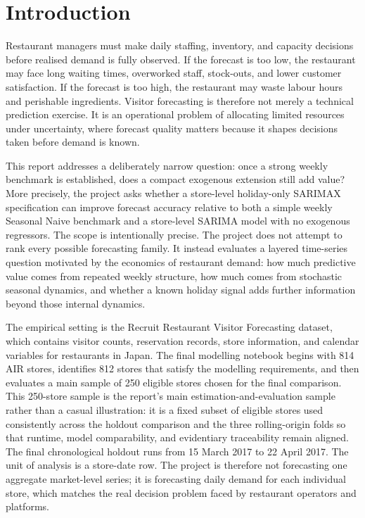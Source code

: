 \documentclass[11pt,oneside]{scrartcl}
\begin{document}
\section{Introduction}
Restaurant managers must make daily staffing, inventory, and capacity decisions before realised demand is fully observed. If the forecast is too low, the restaurant may face long waiting times, overworked staff, stock-outs, and lower customer satisfaction. If the forecast is too high, the restaurant may waste labour hours and perishable ingredients. Visitor forecasting is therefore not merely a technical prediction exercise. It is an operational problem of allocating limited resources under uncertainty, where forecast quality matters because it shapes decisions taken before demand is known.

This report addresses a deliberately narrow question: once a strong weekly benchmark is established, does a compact exogenous extension still add value? More precisely, the project asks whether a store-level holiday-only SARIMAX specification can improve forecast accuracy relative to both a simple weekly Seasonal Naive benchmark and a store-level SARIMA model with no exogenous regressors. The scope is intentionally precise. The project does not attempt to rank every possible forecasting family. It instead evaluates a layered time-series question motivated by the economics of restaurant demand: how much predictive value comes from repeated weekly structure, how much comes from stochastic seasonal dynamics, and whether a known holiday signal adds further information beyond those internal dynamics.

The empirical setting is the Recruit Restaurant Visitor Forecasting dataset, which contains visitor counts, reservation records, store information, and calendar variables for restaurants in Japan. The final modelling notebook begins with 814 AIR stores, identifies 812 stores that satisfy the modelling requirements, and then evaluates a main sample of 250 eligible stores chosen for the final comparison. This 250-store sample is the report's main estimation-and-evaluation sample rather than a casual illustration: it is a fixed subset of eligible stores used consistently across the holdout comparison and the three rolling-origin folds so that runtime, model comparability, and evidentiary traceability remain aligned. The final chronological holdout runs from 15 March 2017 to 22 April 2017. The unit of analysis is a store-date row. The project is therefore not forecasting one aggregate market-level series; it is forecasting daily demand for each individual store, which matches the real decision problem faced by restaurant operators and platforms.
\end{document}
